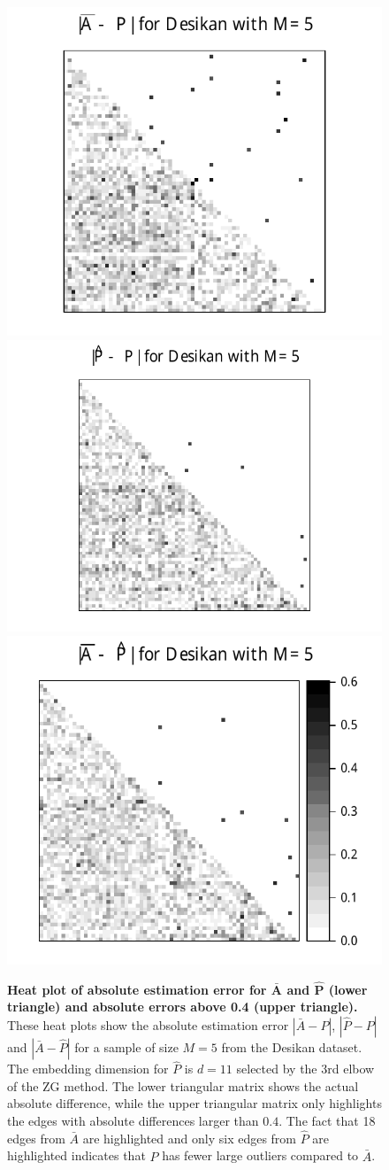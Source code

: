 \documentclass[10pt,letterpaper]{article}
\renewcommand{\hat}{\widehat}
\begin{document}
\begin{figure}

\begin{center}
  \includegraphics[height=.33\linewidth]{Diff2_desikan_m5.pdf}\hspace{-40pt}
  \includegraphics[height=.33\linewidth]{Diff3_desikan_m5.pdf}\hspace{-32pt}
  \includegraphics[height=.33\linewidth]{Diff1_desikan_m5.pdf}
\end{center}

\caption{{\bf Heat plot of absolute estimation error for $\bm{\bar{A}}$ and $\bm{\hat{P}}$ (lower triangle) and absolute errors above 0.4 (upper triangle).}
These heat plots show the absolute estimation error $|\bar{A} - P|$, $|\hat{P} - P|$ and $|\bar{A} - \hat{P}|$ for a sample of size $M=5$ from the Desikan dataset.
The embedding dimension for $\hat{P}$ is $d=11$ selected by the 3rd elbow of the ZG method. The lower triangular matrix shows the actual absolute difference, while the upper triangular matrix only highlights the edges with absolute differences larger than $0.4$. The fact that 18 edges from $\bar{A}$ are highlighted and only six edges from $\hat{P}$ are highlighted indicates that $\hat{P}$ has fewer large outliers compared to $\bar{A}$.
}
\label{fig:Diff_desikan_m5}
\end{figure}
\end{document}
